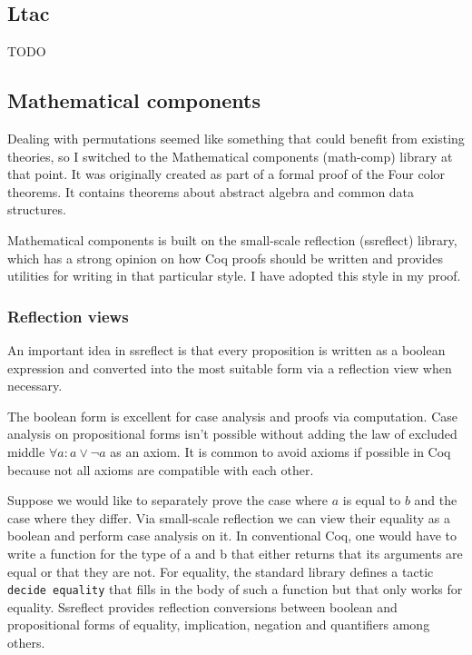 \documentclass[english, 12pt, a4paper, sci, a-1b, online]{aaltothesis}
\newcommand\icoq[1]{\texttt{#1}}
\begin{document}
\subsection{Ltac}

TODO

\subsection{Mathematical components}

Dealing with permutations seemed like something that could benefit from existing theories, so I switched to the Mathematical components (math-comp) library at that point. It was originally created as part of a formal proof of the Four color theorems. It contains theorems about abstract algebra and common data structures.

Mathematical components is built on the small-scale reflection (ssreflect) library, which has a strong opinion on how Coq proofs should be written and provides utilities for writing in that particular style. I have adopted this style in my proof.

\subsubsection{Reflection views}

An important idea in ssreflect is that every proposition is written as a boolean expression and converted into the most suitable form via a reflection view when necessary.~\cite{mathcompbook}

The boolean form is excellent for case analysis and proofs via computation. Case analysis on propositional forms isn't possible without adding the law of excluded middle $\forall a : a \lor \lnot a$ as an axiom. It is common to avoid axioms if possible in Coq because not all axioms are compatible with each other.

Suppose we would like to separately prove the case where $a$ is equal to $b$ and the case where they differ. Via small-scale reflection we can view their equality as a boolean and perform case analysis on it. In conventional Coq, one would have to write a function for the type of a and b that either returns that its arguments are equal or that they are not. For equality, the standard library defines a tactic \icoq{decide equality} that fills in the body of such a function but that only works for equality. Ssreflect provides reflection conversions between boolean and propositional forms of equality, implication, negation and quantifiers among others.
\end{document}
